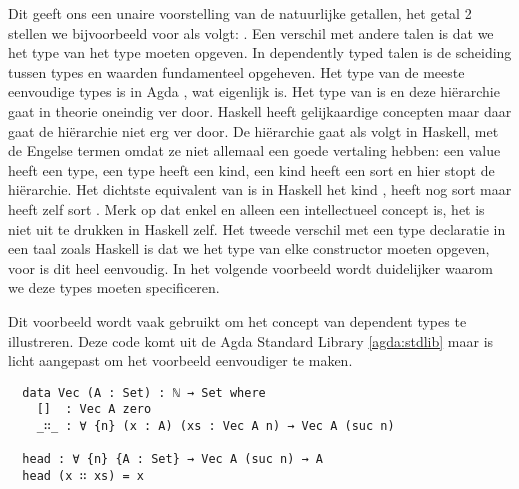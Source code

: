 Dit geeft ons een unaire voorstelling van de natuurlijke getallen, het getal 2
stellen we bijvoorbeeld voor als volgt: . Een verschil
met andere talen is dat we het type van het type moeten opgeven.  In
dependently typed talen is de scheiding tussen types en waarden fundamenteel
opgeheven. Het type van de meeste eenvoudige types is in Agda , wat
eigenlijk  is. Het type van  is  en deze
hiërarchie gaat in theorie oneindig ver door. Haskell heeft gelijkaardige
concepten maar daar gaat de hiërarchie niet erg ver door. De hiërarchie gaat
als volgt in Haskell, met de Engelse termen omdat ze niet allemaal een goede
vertaling hebben: een value heeft een type, een type heeft een kind, een kind
heeft een sort en hier stopt de hiërarchie. Het dichtste equivalent van
 is in Haskell het kind \ihask{*}, \ihask{*} heeft nog sort
 maar  heeft zelf sort . Merk op dat
 enkel en alleen een intellectueel concept is, het is niet uit te
drukken in Haskell zelf.  Het tweede verschil met een type declaratie in een
taal zoals Haskell is dat we het type van elke constructor moeten opgeven, voor
 is dit heel eenvoudig. In het volgende voorbeeld wordt duidelijker
waarom we deze types moeten specificeren.

Dit voorbeeld wordt vaak gebruikt om het concept van dependent types te
illustreren. Deze code komt uit de Agda Standard Library \ref{agda:stdlib} maar
is licht aangepast om het voorbeeld eenvoudiger te maken.

\begin{verbatim}
  data Vec (A : Set) : ℕ → Set where
    []  : Vec A zero
    _∷_ : ∀ {n} (x : A) (xs : Vec A n) → Vec A (suc n)

  head : ∀ {n} {A : Set} → Vec A (suc n) → A
  head (x ∷ xs) = x
\end{verbatim}

